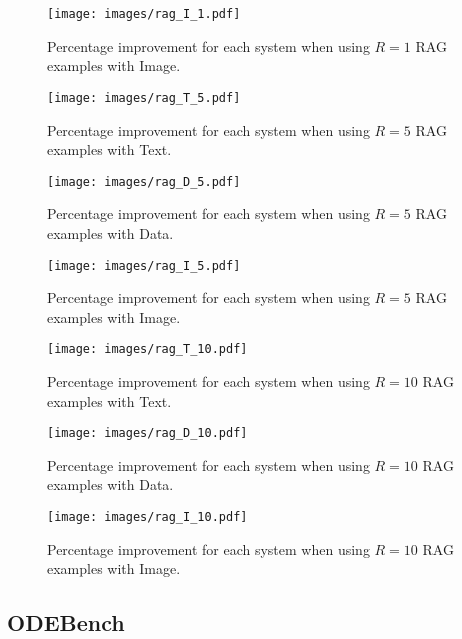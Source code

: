 \documentclass{article}
\begin{document}
\begin{figure}[H]
    \centering
    \texttt{[image: images/rag\_I\_1.pdf]}
    \caption{Percentage improvement for each system when using $R=1$ RAG examples with Image.}
    \label{fig:rag-i-1}
\end{figure}

\begin{figure}[H]
    \centering
    \texttt{[image: images/rag\_T\_5.pdf]}
    \caption{Percentage improvement for each system when using $R=5$ RAG examples with Text.}
    \label{fig:rag-t-5}
\end{figure}

\begin{figure}[H]
    \centering
    \texttt{[image: images/rag\_D\_5.pdf]}
    \caption{Percentage improvement for each system when using $R=5$ RAG examples with Data.}
    \label{fig:rag-d-5}
\end{figure}

\begin{figure}[H]
    \centering
    \texttt{[image: images/rag\_I\_5.pdf]}
    \caption{Percentage improvement for each system when using $R=5$ RAG examples with Image.}
    \label{fig:rag-i-5}
\end{figure}

\begin{figure}[H]
    \centering
    \texttt{[image: images/rag\_T\_10.pdf]}
    \caption{Percentage improvement for each system when using $R=10$ RAG examples with Text.}
    \label{fig:rag-t-10}
\end{figure}

\begin{figure}[H]
    \centering
    \texttt{[image: images/rag\_D\_10.pdf]}
    \caption{Percentage improvement for each system when using $R=10$ RAG examples with Data.}
    \label{fig:rag-d-10}
\end{figure}

\begin{figure}[H]
    \centering
    \texttt{[image: images/rag\_I\_10.pdf]}
    \caption{Percentage improvement for each system when using $R=10$ RAG examples with Image.}
    \label{fig:rag-i-10}
\end{figure}

\subsection{ODEBench}
\end{document}
